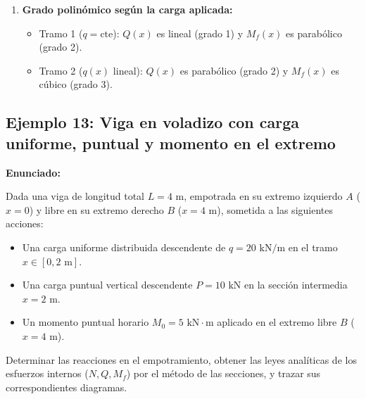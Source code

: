 {\begin{enumerate}
        \item \textbf{Grado polinómico según la carga aplicada:}
              \begin{itemize}
                  \item Tramo 1 ($q = \text{cte}$): $Q(x)$ es lineal (grado 1) y $M_f(x)$ es parabólico (grado 2).
                  \item Tramo 2 ($q(x)$ lineal): $Q(x)$ es parabólico (grado 2) y $M_f(x)$ es cúbico (grado 3).
              \end{itemize}
    \end{enumerate}
}

\subsection{Ejemplo 13: Viga en voladizo con carga uniforme, puntual y momento en el extremo}

\textbf{Enunciado:}

Dada una viga de longitud total $L = 4\text{ m}$, empotrada en su extremo izquierdo $A$ ($x = 0$) y libre en su extremo derecho $B$ ($x = 4\text{ m}$), sometida a las siguientes acciones:
\begin{itemize}
    \item Una carga uniforme distribuida descendente de $q = 20\text{ kN/m}$ en el tramo $x \in [0, 2\text{ m}]$.
    \item Una carga puntual vertical descendente $P = 10\text{ kN}$ en la sección intermedia $x = 2\text{ m}$.
    \item Un momento puntual horario $M_0 = 5\text{ kN}\cdot\text{m}$ aplicado en el extremo libre $B$ ($x = 4\text{ m}$).
\end{itemize}

Determinar las reacciones en el empotramiento, obtener las leyes analíticas de los esfuerzos internos ($N, Q, M_f$) por el método de las secciones, y trazar sus correspondientes diagramas.

